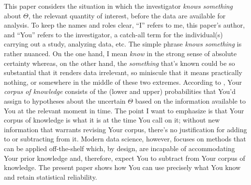 \documentclass[a4paper, 12pt]{article}
\theoremstyle{plain}
\theoremstyle{definition}
\theoremstyle{remark}
\begin{document}
This paper considers the situation in which the investigator {\em knows something} about $\Theta$, the relevant quantity of interest, before the data are available for analysis.  To keep the names and roles clear, ``I'' refers to me, this paper's author, and ``You'' refers to the investigator, a catch-all term for the individual(s) carrying out a study, analyzing data, etc.  The simple phrase {\em knows something} is rather nuanced.  On the one hand, I mean {\em know} in the strong sense of absolute certainty whereas, on the other hand, the {\em something} that's known could be so substantial that it renders data irrelevant, so miniscule that it means practically nothing, or somewhere in the middle of these two extremes.  
According to \citet{levi1980}, Your {\em corpus of knowledge} consists of the (lower and upper) probabilities that You'd assign to hypotheses about the uncertain $\Theta$ based on the information available to You at the relevant moment in time.  
The point I want to emphasize is that Your corpus of knowledge is what it is at the time You call on it; without new information that warrants revising Your corpus, there's no justification for adding to or subtracting from it. Modern data science, however, focuses on methods that can be applied off-the-shelf which, by design, are incapable of accommodating Your prior knowledge and, therefore, expect You to subtract from Your corpus of knowledge. 
The present paper shows how You can use precisely what You know and retain statistical reliability.  
\end{document}
